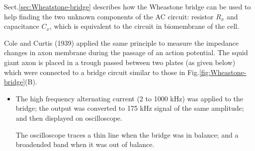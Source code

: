 Sect.\ref{sec:Wheatstone-bridge} describes how the Wheastone bridge can be used
to help finding the two unknown components of the AC circuit: resistor $R_x$ and
capacitance $C_x$, which is equivalent to the circuit in biomembrane of the
cell.

Cole and Curtis (1939) applied the same principle to measure the impedance
changes in axon membrane during the passage of an action potential. The squid
giant axon is placed in a trough passed between two plates (as given below)
which were connected to a bridge circuit similar to those in
Fig.\ref{fig:Wheastone-bridge}(B).
\begin{itemize}
  \item The high frequency alternating current (2 to 1000 kHz) was applied to
  the bridge; 
  the output was converted to 175 kHz signal of the same amplitude; and then
  displayed on oscilloscope.
  
  The oscilloscope traces a thin line when the bridge was in balance; and a
  broadended band when it was out of balance.
  
\end{itemize}

